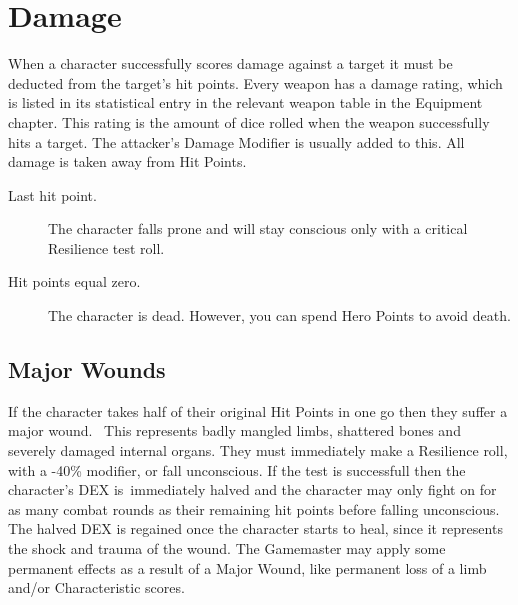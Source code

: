 \section{Damage}
When a character successfully scores damage against a target it must be deducted from the target’s hit points. Every weapon has a damage rating, which is listed in its statistical entry in the relevant weapon table in the Equipment chapter. This rating is the amount of dice rolled when the weapon successfully hits a target. The attacker’s Damage Modifier is usually added to this. All damage is taken away from Hit Points. 

\begin{description}
	\item[Last hit point.] The character falls prone and will stay conscious only with a critical Resilience test roll.
	\item[Hit points equal zero.] The character is dead. However, you can spend Hero Points to avoid death.
\end{description}


\subsection{Major Wounds}
If the character takes half of their original Hit Points in one go then they suffer a major wound.  This represents badly mangled limbs, shattered bones and severely damaged internal organs.
They must immediately make a Resilience roll, with a -40\% modifier, or fall unconscious. If the test is successfull then the character’s DEX is immediately halved and the character may only fight on for as many combat rounds as their remaining hit points before falling unconscious.
The halved DEX is regained once the character starts to heal, since it represents the shock and trauma of the wound.
The Gamemaster may apply some permanent effects as a result of a Major Wound, like permanent loss of a limb and/or Characteristic scores.

